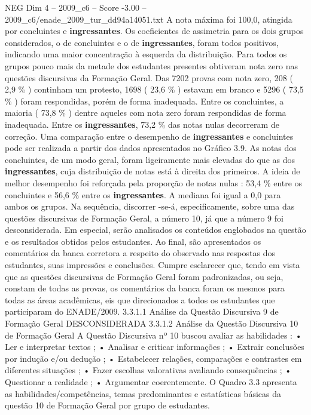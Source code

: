 \begin{textsample}{NEG Dim 4 – 2009\_c6 – Score -3.00 – 2009\_c6/enade\_2009\_tur\_dd94a14051.txt}
A nota máxima foi 100,0, atingida por concluintes e \textbf{ingressantes}.
Os coeficientes de assimetria para os dois grupos considerados, o de concluintes e o de \textbf{ingressantes}, foram todos positivos, indicando uma maior concentração à esquerda da distribuição.
Para todos os grupos pouco mais da metade dos estudantes presentes obtiveram nota zero nas questões discursivas da Formação Geral.
Das 7202 provas com nota zero, 208 ( 2,9 \% ) continham um protesto, 1698 ( 23,6 \% ) estavam em branco e 5296 ( 73,5 \% ) foram respondidas, porém de forma inadequada.
Entre os concluintes, a maioria ( 73,8 \% ) dentre aqueles com nota zero foram respondidas de forma inadequada.
Entre os \textbf{ingressantes}, 73,2 \% das notas nulas decorreram de correção.
Uma comparação entre o desempenho de \textbf{ingressantes} e concluintes pode ser realizada a partir dos dados apresentados no Gráfico 3.9.
As notas dos concluintes, de um modo geral, foram ligeiramente mais elevadas do que as dos \textbf{ingressantes}, cuja distribuição de notas está à direita dos primeiros.
A ideia de melhor desempenho foi reforçada pela proporção de notas nulas : 53,4 \% entre os concluintes e 56,6 \% entre os \textbf{ingressantes}.
A mediana foi igual a 0,0 para ambos os grupos.
Na sequência, discorrer -se-á, especificamente, sobre uma das questões discursivas de Formação Geral, a número 10, já que a número 9 foi desconsiderada.
Em especial, serão analisados os conteúdos englobados na questão e os resultados obtidos pelos estudantes.
Ao final, são apresentados os comentários da banca corretora a respeito do observado nas respostas dos estudantes, suas impressões e conclusões.
Cumpre esclarecer que, tendo em vista que as questões discursivas de Formação Geral foram padronizadas, ou seja, constam de todas as provas, os comentários da banca foram os mesmos para todas as áreas acadêmicas, eis que direcionados a todos os estudantes que participaram do ENADE/2009. 3.3.1.1 Análise da Questão Discursiva 9 de Formação Geral DESCONSIDERADA 3.3.1.2 Análise da Questão Discursiva 10 de Formação Geral A Questão Discursiva nº 10 buscou avaliar as habilidades : • Ler e interpretar textos ; • Analisar e criticar informações ; • Extrair conclusões por indução e/ou dedução ; • Estabelecer relações, comparações e contrastes em diferentes situações ; • Fazer escolhas valorativas avaliando consequências ; • Questionar a realidade ; • Argumentar coerentemente.
O Quadro 3.3 apresenta as habilidades/competências, temas predominantes e estatísticas básicas da questão 10 de Formação Geral por grupo de estudantes.

\end{textsample}
